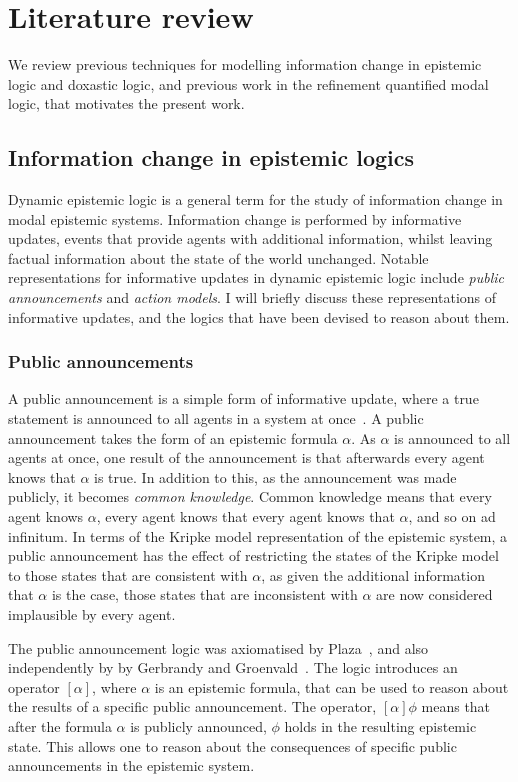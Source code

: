 \chapter{Literature review}\label{litreview}

We review previous techniques for modelling information change in epistemic
logic and doxastic logic, and previous work in the refinement quantified modal
logic, that motivates the present work.

\section{Information change in epistemic logics}

Dynamic epistemic logic is a general term for the study of information change in
modal epistemic systems. Information change is performed by informative updates,
events that provide agents with additional information, whilst leaving factual
information about the state of the world unchanged. Notable representations for
informative updates in dynamic epistemic logic include {\em public
announcements} and {\em action models}. I will briefly discuss these
representations of informative updates, and the logics that have been devised to
reason about them.

\subsection{Public announcements}

A public announcement is a simple form of informative update, where a true
statement is announced to all agents in a system at
once~\cite{vanditmarsch2007dynamic}.  A public announcement takes the form of an
epistemic formula $\alpha$. As $\alpha$ is announced to all agents at once, one
result of the announcement is that afterwards every agent knows that $\alpha$ is
true. In addition to this, as the announcement was made publicly, it becomes
{\em common knowledge}. Common knowledge means that every agent knows $\alpha$,
every agent knows that every agent knows that $\alpha$, and so on ad infinitum.
In terms of the Kripke model representation of the epistemic system, a public
announcement has the effect of restricting the states of the Kripke model to
those states that are consistent with $\alpha$, as given the additional
information that $\alpha$ is the case, those states that are inconsistent with
$\alpha$ are now considered implausible by every agent.

The public announcement logic was axiomatised by Plaza~\cite{plaza2007logics},
and also independently by by Gerbrandy and
Groenvald~\cite{gerbrandy1997reasoning}.  The logic introduces an operator
$[\alpha]$, where $\alpha$ is an epistemic formula, that can be used to reason
about the results of a specific public announcement. The operator, $[\alpha]
\phi$ means that after the formula $\alpha$ is publicly announced, $\phi$ holds
in the resulting epistemic state. This allows one to reason about the
consequences of specific public announcements in the epistemic system.

